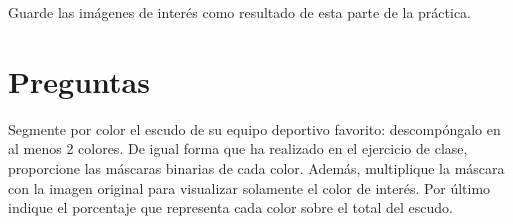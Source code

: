 Guarde las imágenes de interés como resultado de esta parte de la práctica.

\section*{Preguntas}

\vspace{5mm}
\begin{tcolorbox}[colback=gray!10, colframe=gray!30, coltitle=black, title=Pregunta A.1, halign=left]
Segmente por color el escudo de su equipo deportivo favorito: descompóngalo en al menos 2 colores. De igual forma que ha realizado en el ejercicio de clase, proporcione las máscaras binarias de cada color. Además, multiplique la máscara con la imagen original para visualizar solamente el color de interés. Por último indique el porcentaje que representa cada color sobre el total del escudo.
\end{tcolorbox}